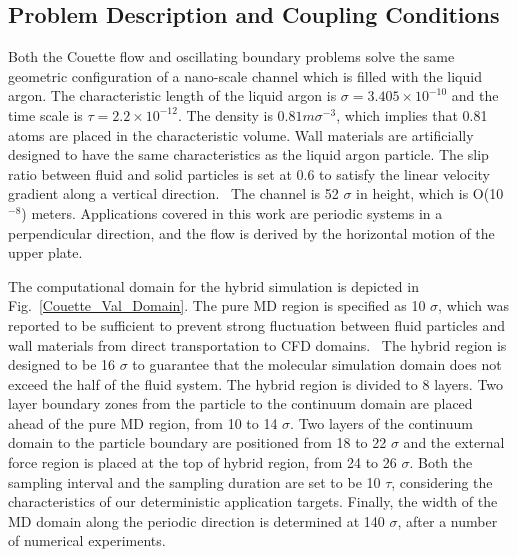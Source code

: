 \documentclass[preprint,12pt]{elsarticle}
\begin{document}
\subsection{Problem Description and Coupling Conditions}
\label{sec:accuracy_conditions}

Both the Couette flow and oscillating boundary problems solve the same geometric configuration of a nano-scale channel which is filled with the liquid argon. The characteristic length of the liquid argon is ${\sigma}=3.405{\times}10^{-10}$ and the time scale is $\tau=2.2{\times}10^{-12}$. The density is $0.81m{\sigma}^{-3}$, which implies that 0.81 atoms are placed in the characteristic volume. Wall materials are artificially designed to have the same characteristics as the liquid argon particle. The slip ratio between fluid and solid particles is set at 0.6 to satisfy the linear velocity gradient along a vertical direction.~\cite{Nie} The channel is 52 $\sigma$ in height, which is O(10$^{-8}$) meters. Applications covered in this work are periodic systems in a perpendicular direction, and the flow is derived by the horizontal motion of the upper plate.

The computational domain for the hybrid simulation is depicted in Fig.~\ref{Couette_Val_Domain}. The pure MD region is specified as 10 $\sigma$, which was reported to be sufficient to prevent strong fluctuation between fluid particles and wall materials from direct transportation to CFD domains.~\cite{Yen} The hybrid region is designed to be 16 $\sigma$ to guarantee that the molecular simulation domain does not exceed the half of the fluid system. The hybrid region is divided to 8 layers. Two layer boundary zones from the particle to the continuum domain are placed ahead of the pure MD region, from 10 to 14 $\sigma$. Two layers of the continuum domain to the particle boundary are positioned from 18 to 22 $\sigma$ and the external force region is placed at the top of hybrid region, from 24 to 26 $\sigma$. Both the sampling interval and the sampling duration are set to be 10 $\tau$, considering the characteristics of our deterministic application targets. Finally, the width of the MD domain along the periodic direction is determined at 140 $\sigma$, after a number of numerical experiments.
\end{document}
